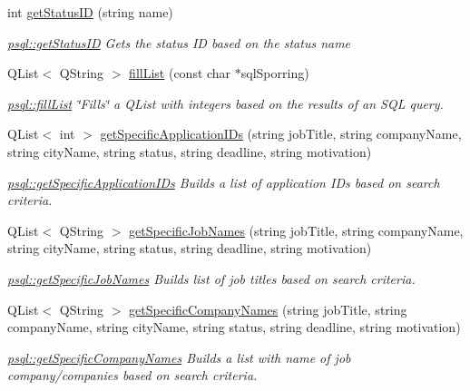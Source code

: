 \begin{DoxyCompactItemize}
int \mbox{\hyperlink{classpsql_a9d13aebcb6d151719769207238865e75}{get\+Status\+ID}} (string name)
\begin{DoxyCompactList}\small\item\em \mbox{\hyperlink{classpsql_a9c02c92c09cb60c35d24375673b7df06}{psql\+::get\+Status\+ID}} Gets the status ID based on the status name \end{DoxyCompactList}\item 
Q\+List$<$ Q\+String $>$ \mbox{\hyperlink{classpsql_a2ad41caea89dc5af0b55b12f6394fbf5}{fill\+List}} (const char $\ast$sql\+Sporring)
\begin{DoxyCompactList}\small\item\em \mbox{\hyperlink{classpsql_a2ad41caea89dc5af0b55b12f6394fbf5}{psql\+::fill\+List}} \char`\"{}\+Fills\char`\"{} a Q\+List with integers based on the results of an S\+QL query. \end{DoxyCompactList}\item 
Q\+List$<$ int $>$ \mbox{\hyperlink{classpsql_ab6edb8a2e42d8ac7c4ae29f5b0cb494f}{get\+Specific\+Application\+I\+Ds}} (string job\+Title, string company\+Name, string city\+Name, string status, string deadline, string motivation)
\begin{DoxyCompactList}\small\item\em \mbox{\hyperlink{classpsql_ab6edb8a2e42d8ac7c4ae29f5b0cb494f}{psql\+::get\+Specific\+Application\+I\+Ds}} Builds a list of application I\+Ds based on search criteria. \end{DoxyCompactList}\item 
Q\+List$<$ Q\+String $>$ \mbox{\hyperlink{classpsql_a029f2ef38c4156cc6c67765900c8245f}{get\+Specific\+Job\+Names}} (string job\+Title, string company\+Name, string city\+Name, string status, string deadline, string motivation)
\begin{DoxyCompactList}\small\item\em \mbox{\hyperlink{classpsql_a029f2ef38c4156cc6c67765900c8245f}{psql\+::get\+Specific\+Job\+Names}} Builds list of job titles based on search criteria. \end{DoxyCompactList}\item 
Q\+List$<$ Q\+String $>$ \mbox{\hyperlink{classpsql_ac2528de5054ba99371d2d796ed32b2b1}{get\+Specific\+Company\+Names}} (string job\+Title, string company\+Name, string city\+Name, string status, string deadline, string motivation)
\begin{DoxyCompactList}\small\item\em \mbox{\hyperlink{classpsql_ac2528de5054ba99371d2d796ed32b2b1}{psql\+::get\+Specific\+Company\+Names}} Builds a list with name of job company/companies based on search criteria. \end{DoxyCompactList}\item 

\end{DoxyCompactItemize}
